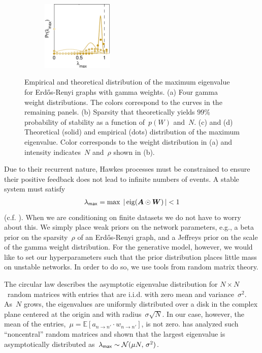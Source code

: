 \begin{figure}[!ht]
\begin{center}
\begin{subfigure}[b]{.22\textwidth}
\caption{}
\label{fig:stability_8_12}
\includegraphics[height=1.3in]{figures/ch2/stability_8_12} 
\end{subfigure}
\end{center}
\vspace{-1em}
\caption[Distribution of the maximum eigenvalue for Erd\H{o}s-Renyi
  graphs with gamma weights]{Empirical and theoretical distribution of
  the maximum eigenvalue for Erd\H{o}s-Renyi graphs with gamma
  weights. (a) Four gamma weight distributions. The colors correspond
  to the curves in the remaining panels. (b) Sparsity that
  theoretically yields ${99\%}$ probability of stability as a function
  of~${p(W)}$ and~$N$. (c) and (d) Theoretical (solid) and empirical
  (dots) distribution of the maximum eigenvalue. Color corresponds to
  the weight distribution in (a) and intensity indicates~$N$
  and~$\rho$ shown in (b).}
\label{fig:stability}
\end{figure}

Due to their recurrent nature, Hawkes processes must be constrained to
ensure their positive feedback does not lead to infinite numbers of
events. A stable system must satisfy
\begin{align*}
  \lambda_{\mathsf{max}}=\max\; |\,\mathrm{eig}(\boldsymbol{A}\odot\boldsymbol{W})\,| < 1
\end{align*}
(c.f. \citet{Daley-1988}). When we are conditioning on finite datasets
we do not have to worry about this. We simply place weak priors on the
network parameters, e.g., a beta prior on the sparsity~${\rho}$ of an
Erd\H{o}s-Renyi graph, and a Jeffreys prior on the scale of the gamma
weight distribution. For the generative model, however, we would like
to set our hyperparameters such that the prior distribution places
little mass on unstable networks. In order to do so, we use tools from
random matrix theory.

The circular law describes the asymptotic eigenvalue distribution for
$N \times N$~random matrices with entries that are i.i.d. with zero
mean and variance~$\sigma^2$. As~$N$ grows, the eigenvalues are
uniformly distributed over a disk in the complex plane centered at the
origin and with radius~$\sigma\sqrt{N}$. In our case, however, the
mean of the entries,~${\mu=\mathbb{E}[a_{n \to n'} \cdot w_{n \to
      n'}]}$, is not zero. \citet{Silverstein-1994} has analyzed such
``noncentral'' random matrices and shown that the largest eigenvalue
is asymptotically distributed
as~${\lambda_{\sf{max}} \sim \mathcal{N}(\mu N,\, \sigma^2)}$.

